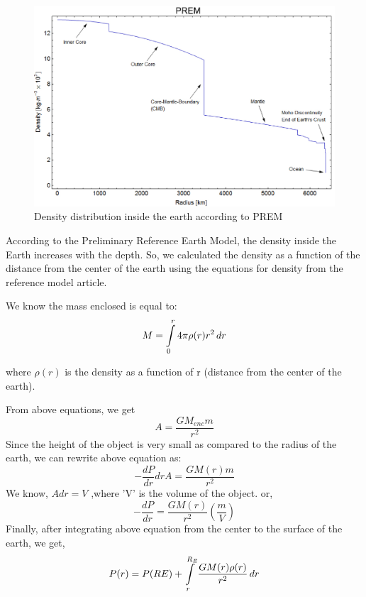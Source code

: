 \documentclass[12pt]{article}
\begin{document}
\begin{figure}[H]
\centering
\includegraphics[width=1.0\textwidth]{density.eps}\caption{Density distribution inside the earth according to PREM}
\end{figure}
According to the Preliminary Reference Earth Model, the density inside the Earth increases with the depth. So, we calculated the density as a function of the distance from the center of the earth using the equations for density from the reference model article. 

We know the mass enclosed is equal to:
\begin{equation}
M=\int\limits_0^r\\4 \pi \rho(r) r^{2}\,dr
\end{equation}

where $\rho(r)$ is the density as a function of r (distance from the center of the earth).

From above equations, we get
\begin{equation}
[P(r)-P(r+dr)]A=\frac{GM_{enc}m}{r^2}
\end{equation}
Since the height of the object is very small as compared to the radius of the earth, we can rewrite above equation as:
\begin{equation}
-\frac{dP}{dr}drA=\frac{GM(r)m}{r^{2}}
\end{equation}
We know, $Adr=V$ ,where 'V' is the volume of the object.
or,
\begin{equation}
-\frac{dP}{dr}=\frac{GM(r)}{r^2} (\frac{m}{V})
\end{equation}
Finally, after integrating above equation from the center to the surface of the earth, we get,
\begin{equation}
P(r)=P(RE)+\int\limits_r^{R_E}\\\frac{GM(r)\rho(r)}{r^2}\,dr
\end{equation}
\end{document}
